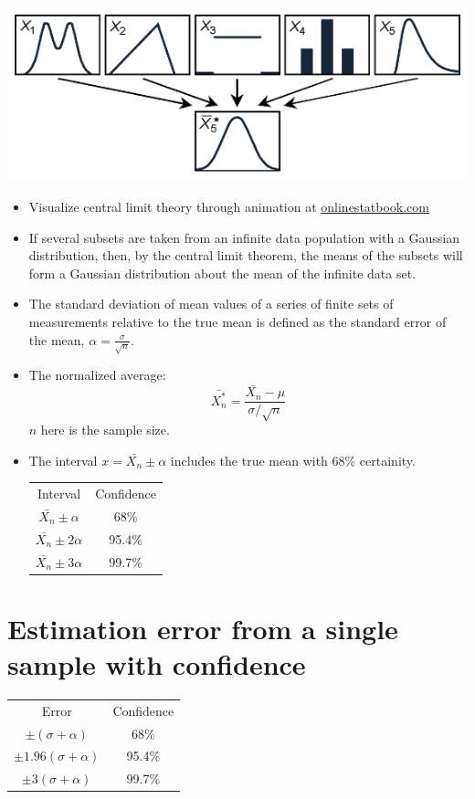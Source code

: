\documentclass[a4paper,11pt,dvipsnames]{book}
\begin{document}
\includegraphics[scale=0.4]{clt}
\begin{itemize}
\item Visualize central limit theory through animation at \href{http://onlinestatbook.com/stat_sim/sampling_dist/index.html}{onlinestatbook.com}
\item If several subsets are taken from an infinite data
population with a Gaussian distribution, then, by the central limit theorem, the means of the subsets will form a Gaussian distribution about
the mean of the infinite data set.
\item The standard deviation of mean values of a
series of finite sets of measurements relative to
the true mean is defined as the standard error
of the mean, $\alpha = \frac{\sigma}{\sqrt{n}}$.
\item The normalized average: 
\begin{equation}
\bar{X_{n}^{*}} = \frac{\bar{X_n} - \mu }{ \sigma / \sqrt{n} }
\end{equation}
$n$ here is the sample size.
\item The interval $x = \bar{X_n} \pm \alpha$ includes the true mean with 68\% certainity. \\
\begin{tabular}{|c|c|}
\hline 
Interval & Confidence \\ 
$\bar{X_n} \pm \alpha$ & 68\% \\ 
$\bar{X_n} \pm 2\alpha$ & 95.4\% \\ 
$\bar{X_n} \pm 3\alpha$ & 99.7\% \\ 
\hline 
\end{tabular} 
\end{itemize}

\section*{Estimation error from a single sample with confidence}

\begin{tabular}{|c|c|}
\hline 
Error & Confidence \\ 
$\pm (\sigma + \alpha )$ & 68\% \\ 
$\pm 1.96(\sigma + \alpha )$ & 95.4\% \\ 
$\pm 3(\sigma + \alpha )$ & 99.7\% \\ 
\hline 
\end{tabular}
\end{document}
